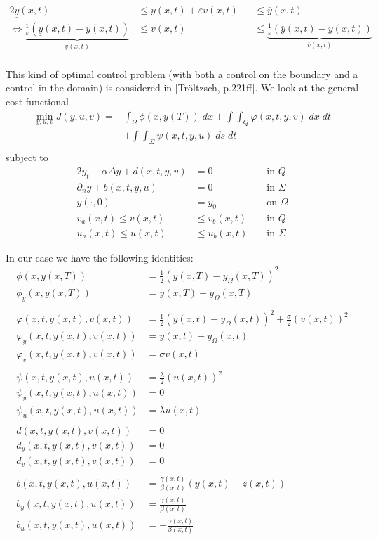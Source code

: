 \documentclass[
12pt, %
a4paper, %
onecolumn, %
portrait %
]{article}
\begin{document}
\begin{alignat*}{2}
\underline{y}(x,t) &\leq y(x,t) + \varepsilon v(x,t) &&\leq \overline{y}(x,t) \\
\Leftrightarrow \underbrace{\frac{1}{\varepsilon}(\underline{y}(x,t) - y(x,t))}_{\underline{v}(x,t)} &\leq v(x,t) &&\leq \underbrace{\frac{1}{\varepsilon}(\overline{y}(x,t) - y(x,t))}_{\overline{v}(x,t)} \\
\end{alignat*}

This kind of optimal control problem (with both a control on the boundary and a control in the domain) is considered in [Tr\"oltzsch, p.221ff]. We look at the general cost functional
\begin{align*}
\min_{y,u,v} J(y, u, v) = & \int_{\Omega} \phi(x, y(T)) \; dx + \int \int_{Q} \varphi(x, t, y, v) \; dx \; dt \\
& + \int \int_{\Sigma} \psi(x,t,y, u) \; ds \; dt \\
\end{align*}
subject to
\begin{alignat*}{2}
y_t - \alpha \Delta y + d(x,t,y,v) &= 0 && \text{ in } Q \\
\partial_n y + b(x,t,y,u) &= 0 && \text{ in } \Sigma \\
y(\cdot,0) &= y_0 && \text{ on } \Omega \\
v_a(x,t) \leq v(x,t) &\leq v_b(x,t) &&\text{ in } Q \\
u_a(x,t) \leq u(x,t) &\leq u_b(x,t) &&\text{ in } \Sigma
\end{alignat*}

In our case we have the following identities:
\begin{align*}
\phi(x,y(x,T)) & = \frac{1}{2} (y(x,T) - y_{\Omega}(x,T))^2 \\
\phi_y(x,y(x,T)) & = y(x,T) - y_{\Omega}(x,T) \\
\\
\varphi(x,t, y(x,t), v(x,t)) & = \frac{1}{2} (y(x,t) - y_{\Omega}(x,t))^2 + \frac{\sigma}{2} (v(x,t))^2 \\
\varphi_y(x,t,y(x,t), v(x,t)) &= y(x,t) - y_{\Omega}(x,t) \\
\varphi_v(x,t,y(x,t), v(x,t)) &= \sigma v(x,t) \\
\\
\psi(x,t,y(x,t), u(x,t)) &= \frac{\lambda}{2} (u(x,t))^2 \\
\psi_y(x,t,y(x,t), u(x,t)) &= 0 \\
\psi_u(x,t,y(x,t), u(x,t)) &= \lambda u(x,t) \\
\\
d(x,t, y(x,t), v(x,t)) &= 0 \\
d_y(x,t, y(x,t), v(x,t)) &= 0 \\
d_v(x,t, y(x,t), v(x,t)) &= 0 \\
\\
b(x,t, y(x,t), u(x,t)) &= \frac{\gamma(x,t)}{\beta(x,t)} (y(x,t) - z(x,t)) \\
b_y(x,t, y(x,t), u(x,t)) &= \frac{\gamma(x,t)}{\beta(x,t)} \\
b_u(x,t, y(x,t), u(x,t)) &= -\frac{\gamma(x,t)}{\beta(x,t)}
\end{align*}
\end{document}
